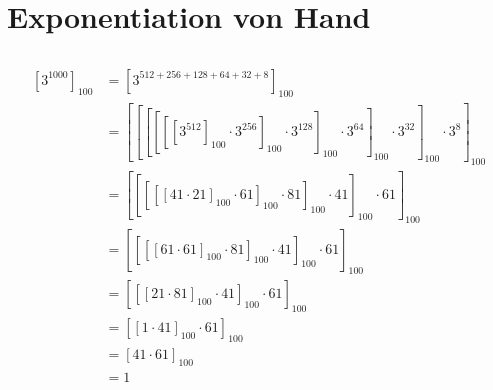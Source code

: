 \documentclass{../crypto}
\date{11. Dezember 2015}
\begin{document}
\maketitle

\section{Exponentiation von Hand}

\subsection{}
\begin{align*}
  \left[3^{1000}\right]_{100}                             & = \left[3^{512+256+128+64+32+8}\right]_{100}               \\
                                                          & = \left[\left[\left[\left[\left[\left[3^{512}\right]_{100}
                              \cdot 3^{256}\right]_{100}
                              \cdot 3^{128}\right]_{100}
                              \cdot 3^{64}\right]_{100}
                              \cdot 3^{32}\right]_{100}
                              \cdot 3^{8}\right]_{100}                                                                 \\
                                                          & = \left[\left[\left[\left[\left[41 \cdot 21\right]_{100}
                              \cdot 61\right]_{100}
                              \cdot 81\right]_{100}
                              \cdot 41\right]_{100}
                              \cdot 61\right]_{100}                                                                    \\
                                                          & = \left[\left[\left[\left[61 \cdot 61\right]_{100}
                              \cdot 81\right]_{100}
                              \cdot 41\right]_{100}
                              \cdot 61\right]_{100}                                                                    \\
                                                          & = \left[\left[\left[21 \cdot 81\right]_{100}
                              \cdot 41\right]_{100}
                              \cdot 61\right]_{100}                                                                    \\
                                                          & = \left[\left[1 \cdot 41\right]_{100}
                              \cdot 61\right]_{100}                                                                    \\
                                                          & = \left[41 \cdot 61\right]_{100}                           \\
                                                          & = 1
\end{align*}
\end{document}
